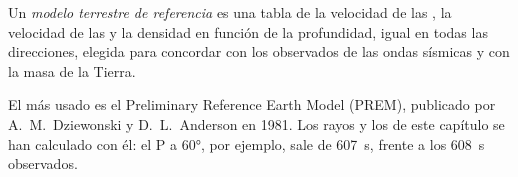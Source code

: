 \begin{definition}\label{def:g11:seismic-structure:reference-model}
Un \emph{modelo terrestre de referencia}
es una tabla de la velocidad de las , la velocidad de las  y la
densidad en función de la profundidad, igual en todas las direcciones,
elegida para concordar con los  observados de las ondas
sísmicas y con la masa de la Tierra.
\end{definition}

El más usado es el Preliminary Reference Earth Model (PREM), publicado por
A.~M.~Dziewonski y D.~L.~Anderson en 1981. Los rayos y los  de este capítulo se han calculado con él: el  P
a \ang{60}, por ejemplo, sale de \qty{607}{s}, frente a los \qty{608}{s}
observados.

